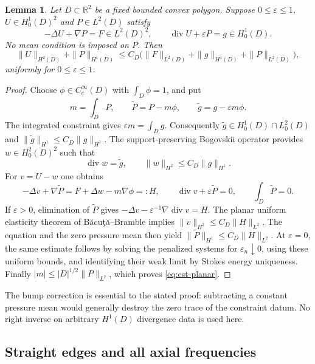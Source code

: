 \documentclass[11pt,a4paper]{article}
\newtheorem{lemma}[theorem]{Lemma}
\theoremstyle{remark}
\numberwithin{equation}{section}
\begin{document}
\begin{lemma}\label{lem:est-planar}
Let $D\subset\mathbb R^2$ be a fixed bounded convex polygon. Suppose
$0\le\varepsilon\le1$, $U\in H_0^1(D)^2$ and $P\in L^2(D)$ satisfy
\[
 -\Delta U+\nabla P=F\in L^2(D)^2,
 \qquad \operatorname{div}U+\varepsilon P=g\in H_0^1(D).
\]
No mean condition is imposed on $P$. Then
\begin{equation}\label{eq:est-planar}
 \|U\|_{H^2(D)}+\|P\|_{H^1(D)}
 \le C_D\bigl(\|F\|_{L^2(D)}+\|g\|_{H^1(D)}+\|P\|_{L^2(D)}\bigr),
\end{equation}
uniformly for $0\le\varepsilon\le1$.
\end{lemma}

\begin{proof}
Choose $\phi\in C_c^\infty(D)$ with $\int_D\phi=1$, and put
\[
 m=\int_D P,\qquad \widetilde P=P-m\phi,
 \qquad \widetilde g=g-\varepsilon m\phi.
\]
The integrated constraint gives $\varepsilon m=\int_Dg$.
Consequently $\widetilde g\in H_0^1(D)\cap L_0^2(D)$ and
$\|\widetilde g\|_{H^1}\le C_D\|g\|_{H^1}$.
The support-preserving Bogovskii operator
\cite{CostabelMcIntosh2010} provides
$w\in H_0^2(D)^2$ such that
\[
 \operatorname{div}w=\widetilde g,
 \qquad \|w\|_{H^2}\le C_D\|g\|_{H^1}.
\]
For $v=U-w$ one obtains
\[
 -\Delta v+\nabla\widetilde P
 =F+\Delta w-m\nabla\phi=:H,
 \qquad \operatorname{div}v+\varepsilon\widetilde P=0,
 \qquad \int_D\widetilde P=0.
\]
If $\varepsilon>0$, elimination of $\widetilde P$ gives
$-\Delta v-\varepsilon^{-1}\nabla\operatorname{div}v=H$.
The planar uniform elasticity theorem of
B\u{a}cu\c{t}\u{a}--Bramble \cite[Theorem 3.1]{BacutaBramble2003}
implies $\|v\|_{H^2}\le C_D\|H\|_{L^2}$.
The equation and the zero pressure mean then yield
$\|\widetilde P\|_{H^1}\le C_D\|H\|_{L^2}$.
At $\varepsilon=0$, the same estimate follows by solving the penalized
systems for $\varepsilon_n\downarrow0$, using these uniform bounds, and
identifying their weak limit by Stokes energy uniqueness.
Finally $|m|\le |D|^{1/2}\|P\|_{L^2}$, which proves
\eqref{eq:est-planar}.
\end{proof}

The bump correction is essential to the stated proof: subtracting a
constant pressure mean would generally destroy the zero trace of the
constraint datum. No right inverse on arbitrary $H^1(D)$ divergence data
is used here.

\subsection{Straight edges and all axial frequencies}
\end{document}
